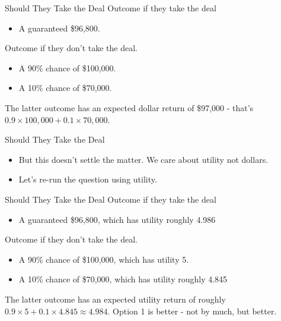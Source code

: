 \documentclass[
  ignorenonframetext,
]{beamer}
\providecommand{\tightlist}{%
  \setlength{\itemsep}{0pt}\setlength{\parskip}{0pt}}
\begin{document}
\begin{frame}{Should They Take the Deal}
\protect\hypertarget{should-they-take-the-deal}{}
Outcome if they take the deal

\begin{itemize}
\tightlist
\item
  A guaranteed \$96,800. \pause
\end{itemize}

Outcome if they don't take the deal.

\begin{itemize}
\tightlist
\item
  A 90\% chance of \$100,000.
\item
  A 10\% chance of \$70,000. \pause
\end{itemize}

The latter outcome has an expected dollar return of \$97,000 - that's
\(0.9 \times 100,000 + 0.1 \times 70,000\).
\end{frame}

\begin{frame}{Should They Take the Deal}
\protect\hypertarget{should-they-take-the-deal-1}{}
\begin{itemize}
\tightlist
\item
  But this doesn't settle the matter. We care about utility not dollars.
\item
  Let's re-run the question using utility.
\end{itemize}
\end{frame}

\begin{frame}{Should They Take the Deal}
\protect\hypertarget{should-they-take-the-deal-2}{}
Outcome if they take the deal

\begin{itemize}
\tightlist
\item
  A guaranteed \$96,800, which has utility roughly 4.986 \pause
\end{itemize}

Outcome if they don't take the deal.

\begin{itemize}
\tightlist
\item
  A 90\% chance of \$100,000, which has utility 5.
\item
  A 10\% chance of \$70,000, which has utility roughly 4.845 \pause
\end{itemize}

The latter outcome has an expected utility return of roughly
\(0.9 \times 5 + 0.1 \times 4.845 \approx 4.984\). Option 1 is better -
not by much, but better.
\end{frame}
\end{document}
